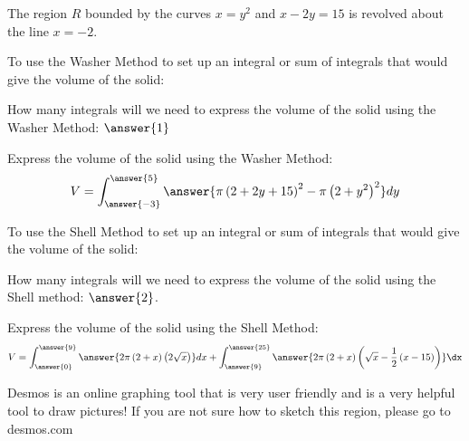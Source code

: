 \documentclass{ximera}
\author{ Jason Miller}
\begin{document}
\begin{exercise}

The region $R$ bounded by the curves $x=y^{2}$ and $x-2y=15$ is revolved about the line $x=-2$. 

To use the Washer Method to set up an integral or sum of integrals that would give the volume of the solid: 

  \begin{multipleChoice}
  \end{multipleChoice}

How many integrals will we need to express the volume of the solid using the Washer Method: $\answer{1}$


\begin{exercise} 
Express the volume of the solid using the Washer Method: 
\[
V=\int_{\answer{-3}}^{\answer{5}} \answer{\pi \left(2+2y+15 \right)^{2}-\pi \left( 2+y^{2}\right)^{2}} dy 
\] 

\begin{exercise} 


To use the Shell Method to set up an integral or sum of integrals that would give the volume of the solid: 

  \begin{multipleChoice}
  \end{multipleChoice}

How many integrals will we need to express the volume of the solid using the Shell method: $\answer{2}$. 


\begin{exercise}
Express the volume of the solid using the Shell Method: 
\[
V=\int_{\answer{0}}^{\answer{9}} \answer{2\pi \left( 2+x \right) \left(2 \sqrt{x} \right)} dx + \int_{\answer{9}}^{\answer{25}} \answer{ 2\pi \left( 2 +x \right) \left( \sqrt{x} - \frac{1}{2}\left( x -15 \right) \right) } \dx 
\]

\begin{hint}
Desmos is an online graphing tool that is very user friendly and is a very helpful tool to draw pictures!  If you are not sure how to sketch this region, please go to desmos.com
\end{hint}

\end{exercise}
\end{exercise}
\end{exercise}
\end{exercise}
\end{document}
